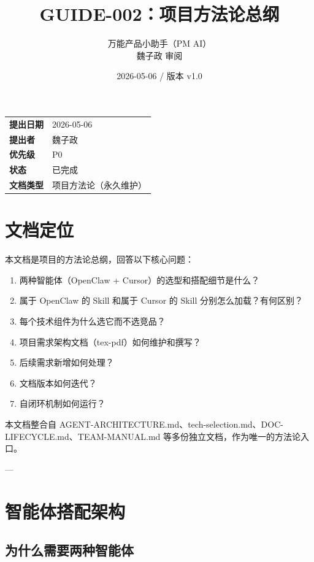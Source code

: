 \documentclass[11pt,a4paper]{article}
\title{\textbf{GUIDE-002：项目方法论总纲}}
\author{万能产品小助手（PM AI）\\魏子政 审阅}
\date{2026-05-06 / 版本 v1.0}
\begin{document}
\maketitle

\begin{center}
\begin{tabular}{>{\bfseries}p{3cm} p{10cm}}
\toprule
提出日期 & 2026-05-06 \\
提出者 & 魏子政 \\
优先级 & \textcolor{danger}{P0} \\
状态 & \textcolor{success}{已完成} \\
文档类型 & 项目方法论（永久维护） \\
\bottomrule
\end{tabular}
\end{center}

\vspace{1em}

\section{文档定位}

本文档是项目的方法论总纲，回答以下核心问题：

\begin{enumerate}[nosep]
  \item 两种智能体（OpenClaw + Cursor）的选型和搭配细节是什么？
  \item 属于 OpenClaw 的 Skill 和属于 Cursor 的 Skill 分别怎么加载？有何区别？
  \item 每个技术组件为什么选它而不选竞品？
  \item 项目需求架构文档（tex-pdf）如何维护和撰写？
  \item 后续需求新增如何处理？
  \item 文档版本如何迭代？
  \item 自闭环机制如何运行？
\end{enumerate}

本文档整合自 AGENT-ARCHITECTURE.md、tech-selection.md、DOC-LIFECYCLE.md、TEAM-MANUAL.md 等多份独立文档，作为唯一的方法论入口。

---

\section{智能体搭配架构}

\subsection{为什么需要两种智能体}
\end{document}
